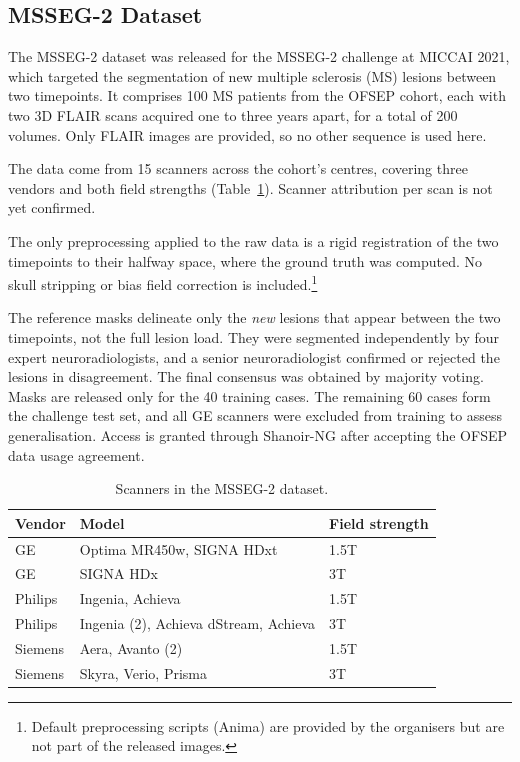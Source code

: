 \subsection{MSSEG-2 Dataset}

The MSSEG-2 dataset was released for the MSSEG-2 challenge at MICCAI 2021, which targeted the
segmentation of new multiple sclerosis (MS) lesions between two timepoints. It comprises 100 MS
patients from the OFSEP cohort, each with two 3D FLAIR scans acquired one to three years apart,
for a total of 200 volumes. Only FLAIR images are provided, so no other sequence is used here.

The data come from 15 scanners across the cohort's centres, covering three vendors and both field
strengths (Table~\ref{tab:msseg2-scanners}). Scanner attribution per scan is
not yet confirmed.

The only preprocessing applied to the raw data is a rigid registration of the two timepoints to
their halfway space, where the ground truth was computed. No skull stripping or bias field
correction is included.\footnote{Default preprocessing scripts (Anima) are provided by the
organisers but are not part of the released images.}

The reference masks delineate only the \emph{new} lesions that appear between the two timepoints,
not the full lesion load. They were segmented independently by four expert neuroradiologists, and
a senior neuroradiologist confirmed or rejected the lesions in disagreement. The final consensus
was obtained by majority voting. Masks are released only for the 40 training cases. The remaining
60 cases form the challenge test set, and all GE scanners were excluded from training to assess
generalisation. Access is granted through Shanoir-NG after accepting the OFSEP data usage
agreement.

\begin{table}[ht]
\centering
\caption{Scanners in the MSSEG-2 dataset.}
\label{tab:msseg2-scanners}
\begin{tabular}{lll}
\hline
Vendor & Model & Field strength \\
\hline
GE      & Optima MR450w, SIGNA HDxt & 1.5T \\
GE      & SIGNA HDx & 3T \\
Philips & Ingenia, Achieva & 1.5T \\
Philips & Ingenia (2), Achieva dStream, Achieva & 3T \\
Siemens & Aera, Avanto (2) & 1.5T \\
Siemens & Skyra, Verio, Prisma & 3T \\
\hline
\end{tabular}
\end{table}

